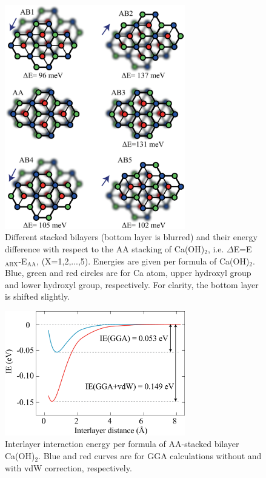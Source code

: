 \begin{figure}[htbp]
\centering
\includegraphics[width=0.7\textwidth]{stack_caoh2.eps}
\caption{\label{fig:stack_caoh2} Different stacked bilayers (bottom layer is blurred)
and their energy difference with respect to the AA stacking of Ca(OH)$_2$, i.e.
$\Delta$E=E$_{\text{ABX}}$-E$_{\text{AA}}$, (X=1,2,...,5). Energies are given
per formula of Ca(OH)$_2$. Blue, green and red circles are for Ca atom, 
upper hydroxyl group and lower hydroxyl group, respectively. For clarity, the 
bottom layer is shifted slightly.}
\end{figure}

\begin{figure}[htbp]
\centering
\includegraphics[width=0.7\textwidth]{int_caoh2.eps}
\caption{\label{fig:int_caoh2} Interlayer interaction energy per formula of
AA-stacked bilayer Ca(OH)$_2$. Blue and red curves are for GGA calculations
without and with vdW correction, respectively.}
\end{figure}

